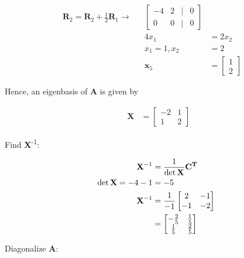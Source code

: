 \documentclass{article}
\begin{document}
\begin{align}
    \\
    \label{eq:13}
    \textbf{R}_2 = \textbf{R}_2 + \frac{1}{2}\textbf{R}_1 \rightarrow && \begin{bmatrix}
    -4 & 2 &|& 0\\
    0 & 0 &|& 0
    \end{bmatrix}
    \\
    \label{eq:14}
    && 4x_1 &= 2x_2
    \\
    \label{eq:15}
    && x_1 = 1, x_2 &= 2
    \\
    \label{eq:16}
    && \textbf{x}_5 &= \begin{bmatrix}
    1\\2
    \end{bmatrix}
\end{align}

Hence, an eigenbasis of \textbf{A} is given by

\begin{align}
    \label{eq:17}
    && \textbf{X} &= \begin{bmatrix}
    -2 & 1\\
    1 & 2
    \end{bmatrix}
\end{align}

Find \textbf{X}\textsuperscript{-1}:

\begin{align}
    \label{eq:18}
    && \textbf{X}^{-1} &= \frac{1}{\det \textbf{X}}\textbf{C\textsuperscript{T}}
    \\
    \label{eq:19}
    && \det \textbf{X} = -4-1 &= -5
    \\
    \label{eq:20}
    && \textbf{X}^{-1} &= \frac{1}{-1}\begin{bmatrix}
    2 & -1\\
    -1 & -2
    \end{bmatrix}
    \\
    \label{eq:21}
    && &= \begin{bmatrix}
    -\frac{2}{5} & \frac{1}{5}\\
    \frac{1}{5} & \frac{2}{5}
    \end{bmatrix}
\end{align}

Diagonalize \textbf{A}:
\end{document}
